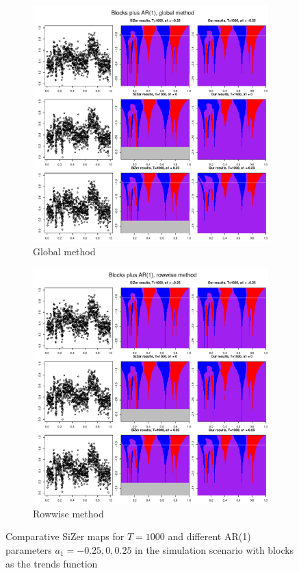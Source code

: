 \documentclass[a4paper,12pt]{article}
\begin{document}
\begin{figure}[t!]
\begin{subfigure}[b]{0.475\textwidth}
\includegraphics[width=\textwidth]{Plots/SiZer_comparison_blocks_global_T_1000.pdf}
\caption{Global method}
\end{subfigure}\hspace{0.25cm}
\begin{subfigure}[b]{0.475\textwidth}
\includegraphics[width=\textwidth]{Plots/SiZer_comparison_blocks_rowwise_T_1000.pdf}
\caption{Rowwise method}
\end{subfigure}
\caption{Comparative SiZer maps for $T = 1000$ and different AR(1) parameters $a_1 = -0.25, 0, 0.25$ in the simulation scenario with blocks as the trends function}\label{fig:SiZer_maps_comparison_blocks}
\end{figure}



{\small
\setlength{\bibsep}{0.55em}
}
\end{document}

